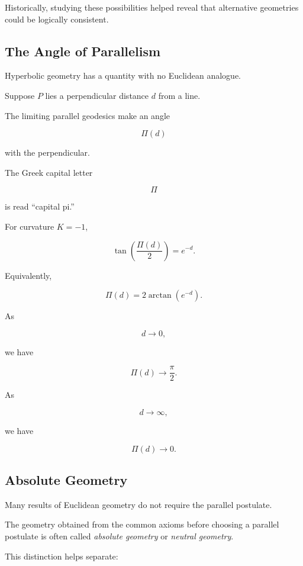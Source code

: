 Historically, studying these possibilities helped reveal that alternative
geometries could be logically consistent.

\subsection{The Angle of Parallelism}
\label{subsec:angle-of-parallelism}

Hyperbolic geometry has a quantity with no Euclidean analogue.

Suppose \(P\) lies a perpendicular distance \(d\) from a line.

The limiting parallel geodesics make an angle

\[
\Pi(d)
\]

with the perpendicular.

The Greek capital letter

\[
\Pi
\]

is read ``capital pi.''

For curvature \(K=-1\),

\[
\boxed{
\tan\left(\frac{\Pi(d)}{2}\right)=e^{-d}.
}
\]

Equivalently,

\[
\boxed{
\Pi(d)
=
2\arctan(e^{-d}).
}
\]

As

\[
d\to0,
\]

we have

\[
\Pi(d)\to\frac{\pi}{2}.
\]

As

\[
d\to\infty,
\]

we have

\[
\Pi(d)\to0.
\]

\subsection{Absolute Geometry}
\label{subsec:absolute-geometry}

Many results of Euclidean geometry do not require the parallel postulate.

The geometry obtained from the common axioms before choosing a parallel
postulate is often called \emph{absolute geometry} or \emph{neutral
geometry}.

This distinction helps separate:

